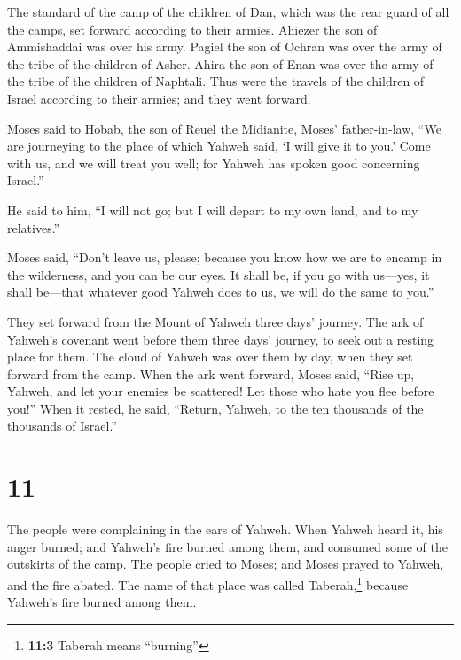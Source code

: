  The standard of the camp of the children of Dan, which
was the rear guard of all the camps, set forward according to their
armies. Ahiezer the son of Ammishaddai was over his army.
 Pagiel the son of Ochran was over the army of the tribe
of the children of Asher.  Ahira the son of Enan was over
the army of the tribe of the children of Naphtali.  Thus
were the travels of the children of Israel according to their armies;
and they went forward.

 Moses said to Hobab, the son of Reuel the Midianite,
Moses' father-in-law, ``We are journeying to the place of which Yahweh
said, `I will give it to you.' Come with us, and we will treat you well;
for Yahweh has spoken good concerning Israel.''

 He said to him, ``I will not go; but I will depart to my
own land, and to my relatives.''

 Moses said, ``Don't leave us, please; because you know
how we are to encamp in the wilderness, and you can be our eyes.
 It shall be, if you go with us---yes, it shall be---that
whatever good Yahweh does to us, we will do the same to you.''

 They set forward from the Mount of Yahweh three days'
journey. The ark of Yahweh's covenant went before them three days'
journey, to seek out a resting place for them.  The cloud
of Yahweh was over them by day, when they set forward from the camp.
 When the ark went forward, Moses said, ``Rise up,
Yahweh, and let your enemies be scattered! Let those who hate you flee
before you!''  When it rested, he said, ``Return, Yahweh,
to the ten thousands of the thousands of Israel.''

\hypertarget{section-10}{%
\section{11}\label{section-10}}

 The people were complaining in the ears of Yahweh. When
Yahweh heard it, his anger burned; and Yahweh's fire burned among them,
and consumed some of the outskirts of the camp.  The
people cried to Moses; and Moses prayed to Yahweh, and the fire abated.
 The name of that place was called Taberah,\footnote{\textbf{11:3}
  Taberah means ``burning''} because Yahweh's fire burned among them.

